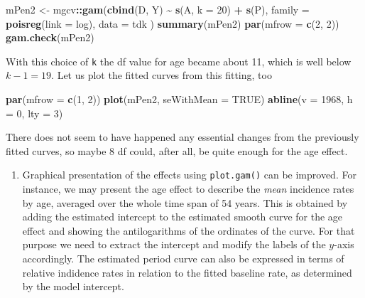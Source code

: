 \documentclass[
]{book}
\newenvironment{Shaded}{\begin{snugshade}}{\end{snugshade}}
\newcommand{\AttributeTok}[1]{\textcolor[rgb]{0.13,0.29,0.53}{#1}}
\newcommand{\ConstantTok}[1]{\textcolor[rgb]{0.56,0.35,0.01}{#1}}
\newcommand{\DecValTok}[1]{\textcolor[rgb]{0.00,0.00,0.81}{#1}}
\newcommand{\FunctionTok}[1]{\textcolor[rgb]{0.13,0.29,0.53}{\textbf{#1}}}
\newcommand{\NormalTok}[1]{#1}
\newcommand{\OtherTok}[1]{\textcolor[rgb]{0.56,0.35,0.01}{#1}}
\newcommand{\SpecialCharTok}[1]{\textcolor[rgb]{0.81,0.36,0.00}{\textbf{#1}}}
\providecommand{\tightlist}{%
  \setlength{\itemsep}{0pt}\setlength{\parskip}{0pt}}
\begin{document}
\begin{Shaded}
\begin{Highlighting}[]
\NormalTok{mPen2 }\OtherTok{\textless{}{-}}\NormalTok{ mgcv}\SpecialCharTok{::}\FunctionTok{gam}\NormalTok{(}\FunctionTok{cbind}\NormalTok{(D, Y) }\SpecialCharTok{\textasciitilde{}} \FunctionTok{s}\NormalTok{(A, }\AttributeTok{k =} \DecValTok{20}\NormalTok{) }\SpecialCharTok{+} \FunctionTok{s}\NormalTok{(P),}
  \AttributeTok{family =} \FunctionTok{poisreg}\NormalTok{(}\AttributeTok{link =}\NormalTok{ log), }\AttributeTok{data =}\NormalTok{ tdk}
\NormalTok{)}
\FunctionTok{summary}\NormalTok{(mPen2)}
\FunctionTok{par}\NormalTok{(}\AttributeTok{mfrow =} \FunctionTok{c}\NormalTok{(}\DecValTok{2}\NormalTok{, }\DecValTok{2}\NormalTok{))}
\FunctionTok{gam.check}\NormalTok{(mPen2)}
\end{Highlighting}
\end{Shaded}

With this choice of \texttt{k} the df value for age became about 11,
which is well below \(k-1 = 19\). Let us plot the fitted curves from
this fitting, too

\begin{Shaded}
\begin{Highlighting}[]
\FunctionTok{par}\NormalTok{(}\AttributeTok{mfrow =} \FunctionTok{c}\NormalTok{(}\DecValTok{1}\NormalTok{, }\DecValTok{2}\NormalTok{))}
\FunctionTok{plot}\NormalTok{(mPen2, }\AttributeTok{seWithMean =} \ConstantTok{TRUE}\NormalTok{)}
\FunctionTok{abline}\NormalTok{(}\AttributeTok{v =} \DecValTok{1968}\NormalTok{, }\AttributeTok{h =} \DecValTok{0}\NormalTok{, }\AttributeTok{lty =} \DecValTok{3}\NormalTok{)}
\end{Highlighting}
\end{Shaded}

There does not seem to have happened any essential changes from the
previously fitted curves, so maybe 8 df could, after all, be quite
enough for the age effect.

\begin{enumerate}
\def\labelenumi{\arabic{enumi}.}
\setcounter{enumi}{4}
\tightlist
\item
  Graphical presentation of the effects using \texttt{plot.gam()}
  can be improved. For instance, we may present the
  age effect to describe the \emph{mean} incidence rates by age, averaged
  over the whole time span of 54 years. This is obtained by adding
  the estimated intercept
  to the estimated smooth curve for the age effect and showing
  the antilogarithms of the ordinates of the curve.
  For that purpose we need to extract the intercept and modify the
  labels of the \(y\)-axis accordingly. The estimated period curve
  can also be expressed in terms of
  relative indidence rates in relation to the fitted baseline rate,
  as determined by the model intercept.
\end{enumerate}
\end{document}
